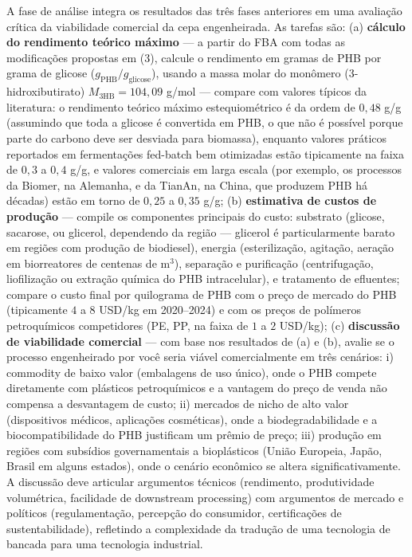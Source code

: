 \begin{exercicio}
A fase de análise integra os resultados das três fases anteriores em uma avaliação crítica da viabilidade comercial da cepa engenheirada. As tarefas são: (a) \textbf{cálculo do rendimento teórico máximo} --- a partir do FBA com todas as modificações propostas em (3), calcule o rendimento em gramas de PHB por grama de glicose ($g_{\text{PHB}}/g_{\text{glicose}}$), usando a massa molar do monômero (3-hidroxibutirato) $M_{\text{3HB}} = 104{,}09$ g/mol --- compare com valores típicos da literatura: o rendimento teórico máximo estequiométrico é da ordem de $0{,}48$ g/g (assumindo que toda a glicose é convertida em PHB, o que não é possível porque parte do carbono deve ser desviada para biomassa), enquanto valores práticos reportados em fermentações fed-batch bem otimizadas estão tipicamente na faixa de $0{,}3$ a $0{,}4$ g/g, e valores comerciais em larga escala (por exemplo, os processos da Biomer, na Alemanha, e da TianAn, na China, que produzem PHB há décadas) estão em torno de $0{,}25$ a $0{,}35$ g/g; (b) \textbf{estimativa de custos de produção} --- compile os componentes principais do custo: substrato (glicose, sacarose, ou glicerol, dependendo da região --- glicerol é particularmente barato em regiões com produção de biodiesel), energia (esterilização, agitação, aeração em biorreatores de centenas de m$^3$), separação e purificação (centrifugação, liofilização ou extração química do PHB intracelular), e tratamento de efluentes; compare o custo final por quilograma de PHB com o preço de mercado do PHB (tipicamente $4$ a $8$ USD/kg em 2020--2024) e com os preços de polímeros petroquímicos competidores (PE, PP, na faixa de $1$ a $2$ USD/kg); (c) \textbf{discussão de viabilidade comercial} --- com base nos resultados de (a) e (b), avalie se o processo engenheirado por você seria viável comercialmente em três cenários: i) commodity de baixo valor (embalagens de uso único), onde o PHB compete diretamente com plásticos petroquímicos e a vantagem do preço de venda não compensa a desvantagem de custo; ii) mercados de nicho de alto valor (dispositivos médicos, aplicações cosméticas), onde a biodegradabilidade e a biocompatibilidade do PHB justificam um prêmio de preço; iii) produção em regiões com subsídios governamentais a bioplásticos (União Europeia, Japão, Brasil em alguns estados), onde o cenário econômico se altera significativamente. A discussão deve articular argumentos técnicos (rendimento, produtividade volumétrica, facilidade de downstream processing) com argumentos de mercado e políticos (regulamentação, percepção do consumidor, certificações de sustentabilidade), refletindo a complexidade da tradução de uma tecnologia de bancada para uma tecnologia industrial.
\end{exercicio}


